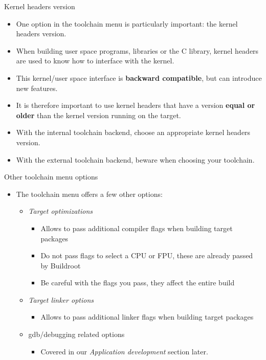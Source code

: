 \begin{frame}{Kernel headers version}
  \begin{itemize}
  \item One option in the toolchain menu is particularly important:
    the kernel headers version.
  \item When building user space programs, libraries or the C library,
    kernel headers are used to know how to interface with the kernel.
  \item This kernel/user space interface is {\bf backward compatible},
    but can introduce new features.
  \item It is therefore important to use kernel headers that have a
    version {\bf equal or older} than the kernel version running on
    the target.
  \item With the internal toolchain backend, choose an appropriate
    kernel headers version.
  \item With the external toolchain backend, beware when choosing your
    toolchain.
  \end{itemize}
\end{frame}

\begin{frame}{Other toolchain menu options}
  \begin{itemize}
  \item The toolchain menu offers a few other options:
    \begin{itemize}
    \item {\em Target optimizations}
      \begin{itemize}
      \item Allows to pass additional compiler flags when building
        target packages
      \item Do not pass flags to select a CPU or FPU, these are
        already passed by Buildroot
      \item Be careful with the flags you pass, they affect the entire
        build
      \end{itemize}
    \item {\em Target linker options}
      \begin{itemize}
      \item Allows to pass additional linker flags when building
        target packages
      \end{itemize}
    \item gdb/debugging related options
      \begin{itemize}
      \item Covered in our {\em Application development} section later.
      \end{itemize}
    \end{itemize}
  \end{itemize}
\end{frame}
